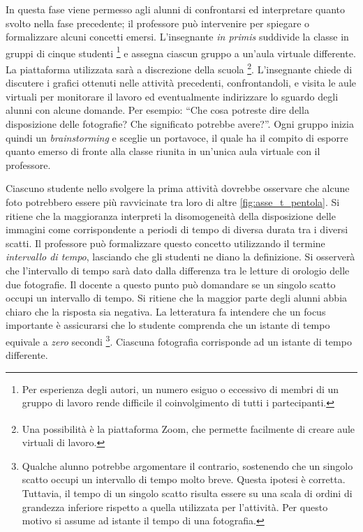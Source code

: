 \documentclass{report} \usepackage[T1]{fontenc} \usepackage[italian]{babel}
\begin{document}
In questa fase viene permesso agli alunni di confrontarsi ed interpretare
quanto svolto nella fase precedente; il professore può intervenire per spiegare
o formalizzare alcuni concetti emersi.
L’insegnante \emph{in primis} suddivide la classe in gruppi di cinque studenti
\footnote{
          Per  esperienza degli autori, un numero esiguo o eccessivo di membri
          di un gruppo di lavoro rende difficile il coinvolgimento di tutti i
          partecipanti.
         }
e assegna
ciascun gruppo a un’aula virtuale differente. La piattaforma utilizzata sarà a
discrezione della scuola
\footnote{
          Una possibilità è la piattaforma Zoom\textsuperscript{\textregistered},
          che  permette facilmente di creare aule virtuali di lavoro.
         }.
L’insegnante chiede di
discutere i grafici ottenuti nelle attività precedenti, confrontandoli, e
visita le aule virtuali per monitorare il lavoro ed eventualmente indirizzare
lo sguardo degli alunni con alcune domande. Per esempio: ``Che cosa potreste
dire della disposizione delle fotografie? Che significato potrebbe avere?''.
Ogni gruppo inizia quindi un \emph{brainstorming} e sceglie un portavoce,
il quale ha il  compito di esporre quanto emerso di fronte alla classe riunita
in un’unica aula virtuale con il professore.

Ciascuno studente nello svolgere la prima attività dovrebbe osservare che
alcune foto potrebbero essere più ravvicinate tra loro di altre
\ref{fig:asse_t_pentola}. Si ritiene che la maggioranza
interpreti la disomogeneità della disposizione delle
immagini come corrispondente a periodi di tempo di diversa durata tra i diversi
scatti. Il professore può formalizzare questo concetto utilizzando il termine
\emph{intervallo di tempo}, lasciando che gli studenti ne diano la definizione.
Si osserverà che l’intervallo di tempo sarà dato dalla differenza tra le
letture di orologio delle due fotografie. Il docente a questo punto può
domandare se un singolo scatto occupi un intervallo di tempo. Si ritiene che la
maggior parte degli alunni abbia chiaro che la risposta sia negativa. La letteratura
fa intendere che un focus importante è assicurarsi che lo studente comprenda
che un istante di tempo equivale a \emph{zero} secondi\cite{arons1997teaching}
\footnote{
          Qualche alunno potrebbe argomentare il contrario, sostenendo che un singolo scatto
          occupi un intervallo di tempo molto breve. Questa ipotesi è corretta. Tuttavia,
          il tempo di un singolo scatto risulta essere su una scala di ordini di
          grandezza inferiore rispetto a quella utilizzata per l’attività. Per questo
          motivo si assume ad istante il tempo di una fotografia.
         }.
Ciascuna fotografia corrisponde ad un istante di tempo differente.
\end{document}
